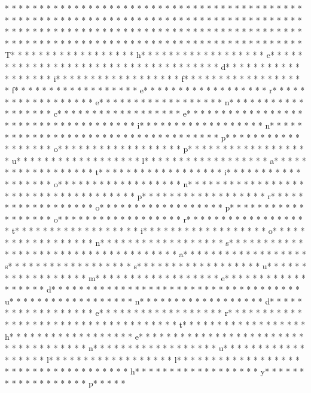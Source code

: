 * * *  * * *  * * *  *  * * *  *  * * *  * * *  * * *  *  * * *  *  * * *  * * *  * * *  *  * * *  *  * * *  *  * * *  * * *  * * *  *  * * *  *  * * *  *  * * *  * * *  * * *  *  * * *  *  * * *  *  * * *  * * *  * * *  *  * * *  *  * * *  *  * * *  * * *  * * *  *  * * *  *  * * *  *  * * *  * * *  * * *  *  * * *  *  * * *  *  * * *  * * *  * * *  *  * * *  *  * * *  *  * * *  * * *  * * *  *  * * *  *  * * *  * T* * *  * * *  * * *  *  * * *  *  * * *  * h* * *  * * *  * * *  *  * * *  *  * * *  * e* * *  * * *  * * *  *  * * *  *  * * *  *  * * *  * * *  * * *  *  * * *  *  * * *  * d* * *  * * *  * * *  *  * * *  *  * * *  * i* * *  * * *  * * *  *  * * *  *  * * *  * f* * *  * * *  * * *  *  * * *  *  * * *  * f* * *  * * *  * * *  *  * * *  *  * * *  * e* * *  * * *  * * *  *  * * *  *  * * *  * r* * *  * * *  * * *  *  * * *  *  * * *  * e* * *  * * *  * * *  *  * * *  *  * * *  * n* * *  * * *  * * *  *  * * *  *  * * *  * c* * *  * * *  * * *  *  * * *  *  * * *  * e* * *  * * *  * * *  *  * * *  *  * * *  *  * * *  * * *  * * *  *  * * *  *  * * *  * i* * *  * * *  * * *  *  * * *  *  * * *  * n* * *  * * *  * * *  *  * * *  *  * * *  *  * * *  * * *  * * *  *  * * *  *  * * *  * p* * *  * * *  * * *  *  * * *  *  * * *  * o* * *  * * *  * * *  *  * * *  *  * * *  * p* * *  * * *  * * *  *  * * *  *  * * *  * u* * *  * * *  * * *  *  * * *  *  * * *  * l* * *  * * *  * * *  *  * * *  *  * * *  * a* * *  * * *  * * *  *  * * *  *  * * *  * t* * *  * * *  * * *  *  * * *  *  * * *  * i* * *  * * *  * * *  *  * * *  *  * * *  * o* * *  * * *  * * *  *  * * *  *  * * *  * n* * *  * * *  * * *  *  * * *  *  * * *  *  * * *  * * *  * * *  *  * * *  *  * * *  * p* * *  * * *  * * *  *  * * *  *  * * *  * r* * *  * * *  * * *  *  * * *  *  * * *  * o* * *  * * *  * * *  *  * * *  *  * * *  * p* * *  * * *  * * *  *  * * *  *  * * *  * o* * *  * * *  * * *  *  * * *  *  * * *  * r* * *  * * *  * * *  *  * * *  *  * * *  * t* * *  * * *  * * *  *  * * *  *  * * *  * i* * *  * * *  * * *  *  * * *  *  * * *  * o* * *  * * *  * * *  *  * * *  *  * * *  * n* * *  * * *  * * *  *  * * *  *  * * *  * s* * *  * * *  * * *  *  * * *  *  * * *  *  * * *  * * *  * * *  *  * * *  *  * * *  * a* * *  * * *  * * *  *  * * *  *  * * *  * s* * *  * * *  * * *  *  * * *  *  * * *  * s* * *  * * *  * * *  *  * * *  *  * * *  * u* * *  * * *  * * *  *  * * *  *  * * *  * m* * *  * * *  * * *  *  * * *  *  * * *  * e* * *  * * *  * * *  *  * * *  *  * * *  * d* * *  * * *  * * *  *  * * *  *  * * *  *  * * *  * * *  * * *  *  * * *  *  * * *  * u* * *  * * *  * * *  *  * * *  *  * * *  * n* * *  * * *  * * *  *  * * *  *  * * *  * d* * *  * * *  * * *  *  * * *  *  * * *  * e* * *  * * *  * * *  *  * * *  *  * * *  * r* * *  * * *  * * *  *  * * *  *  * * *  *  * * *  * * *  * * *  *  * * *  *  * * *  * t* * *  * * *  * * *  *  * * *  *  * * *  * h* * *  * * *  * * *  *  * * *  *  * * *  * e* * *  * * *  * * *  *  * * *  *  * * *  *  * * *  * * *  * * *  *  * * *  *  * * *  * n* * *  * * *  * * *  *  * * *  *  * * *  * u* * *  * * *  * * *  *  * * *  *  * * *  * l* * *  * * *  * * *  *  * * *  *  * * *  * l* * *  * * *  * * *  *  * * *  *  * * *  *  * * *  * * *  * * *  *  * * *  *  * * *  * h* * *  * * *  * * *  *  * * *  *  * * *  * y* * *  * * *  * * *  *  * * *  *  * * *  * p* * *  * * 